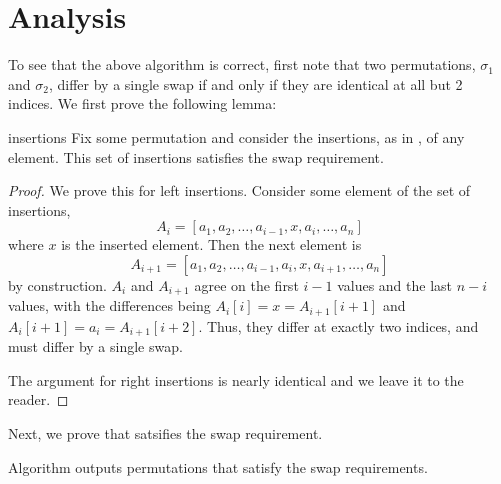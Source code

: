\documentclass[final]{article}
\begin{document}
\section{Analysis}
To see that the above algorithm is correct, first note that two permutations, $\sigma_1$ and $\sigma_2$, differ by a single swap if and only if they are identical at all but 2 indices. We first prove the following lemma:

\begin{lemma}{}{insertions}
    Fix some permutation and consider the insertions, as in , of any element. This set of insertions satisfies the swap requirement.
\end{lemma}

\begin{proof}
    We prove this for left insertions. Consider some element of the set of insertions, \[A_i = [a_1, a_2, \dots, a_{i-1}, x, a_i, \dots, a_n]\] where $x$ is the inserted element. Then the next element is \[A_{i + 1} = [a_1, a_2, \dots, a_{i - 1}, a_i, x, a_{i + 1}, \dots, a_n]\] by construction. $A_i$ and $A_{i + 1}$ agree on the first $i - 1$ values and the last $n - i$ values, with the differences being $A_i[i] = x = A_{i+1}[i+1]$ and $A_i[i+1] = a_i = A_{i+1}[i + 2]$. Thus, they differ at exactly two indices, and must differ by a single swap.

    The argument for right insertions is nearly identical and we leave it to the reader.
\end{proof}

Next, we prove that  satsifies the swap requirement.

\begin{theorem}{}{}
    Algorithm  outputs permutations that satisfy the swap requirements.
\end{theorem}
\end{document}
